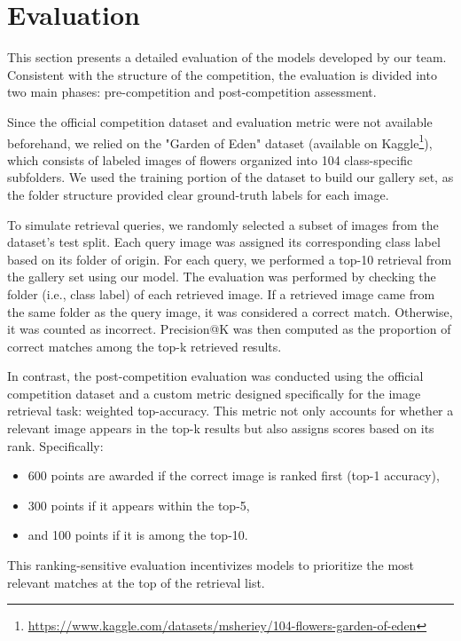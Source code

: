 \section{Evaluation}
This section presents a detailed evaluation of the models developed by our team. Consistent with the structure of the competition, the evaluation is divided into two main phases: pre-competition and post-competition assessment.

Since the official competition dataset and evaluation metric were not available beforehand, we relied on the "Garden of Eden" dataset (available on Kaggle\footnote{\url{https://www.kaggle.com/datasets/msheriey/104-flowers-garden-of-eden}}), which consists of labeled images of flowers organized into 104 class-specific subfolders. 
We used the training portion of the dataset to build our gallery set, as the folder structure provided clear ground-truth labels for each image.

To simulate retrieval queries, we randomly selected a subset of images from the dataset's test split. Each query image was assigned its corresponding class label based on its folder of origin. For each query, we performed a top-10 retrieval from the gallery set using our model.
The evaluation was performed by checking the folder (i.e., class label) of each retrieved image. If a retrieved image came from the same folder as the query image, it was considered a correct match. Otherwise, it was counted as incorrect. 
Precision@K was then computed as the proportion of correct matches among the top-k retrieved results.

In contrast, the post-competition evaluation was conducted using the official competition dataset and a custom metric designed specifically for the image retrieval task: weighted top-accuracy. This metric not only accounts for whether a relevant image appears in the top-k results but also assigns scores based on its rank. Specifically:
\begin{itemize}
\item 600 points are awarded if the correct image is ranked first (top-1 accuracy),
\item 300 points if it appears within the top-5,
\item and 100 points if it is among the top-10.
\end{itemize}
This ranking-sensitive evaluation incentivizes models to prioritize the most relevant matches at the top of the retrieval list.
